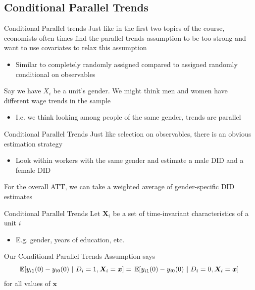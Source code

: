 \documentclass[aspectratio=169,t,11pt,table]{beamer}
\begin{document}
\subsection{Conditional Parallel Trends}

\begin{frame}{Conditional Parallel trends}
  Just like in the first two topics of the course, economists often times find the parallel trends assumption to be too strong and want to use covariates to relax this assumption
  \begin{itemize}
    \item Similar to completely randomly assigned compared to assigned randomly conditional on observables
  \end{itemize}

  \pause
  \bigskip
  Say we have $X_i$ be a unit's gender. We might think men and women have different wage trends in the sample
  \begin{itemize}
    \item I.e. we think looking among people of the same gender, trends are parallel
  \end{itemize}
\end{frame}

\begin{frame}{Conditional Parallel Trends}
  Just like selection on observables, there is an obvious estimation strategy
  \begin{itemize}
    \item Look within workers with the same gender and estimate a male DID and a female DID
  \end{itemize}

  \bigskip
  For the overall ATT, we can take a weighted average of gender-specific DID estimates
\end{frame}

\begin{frame}{Conditional Parallel Trends}
  Let $\bm{X}_i$ be a set of time-invariant characteristics of a unit $i$
  \begin{itemize}
    \item E.g. gender, years of education, etc.
  \end{itemize}

  \bigskip
  Our \alert{Conditional Parallel Trends} Assumption says
  $$
    \expec{y_{i1}(0) - y_{i0}(0)}{D_i = 1, \bm{X}_i = \bm{x}} = 
    \expec{y_{i1}(0) - y_{i0}(0)}{D_i = 0, \bm{X}_i = \bm{x}}
  $$
  for all values of $\bm{x}$ 
\end{frame}
\end{document}
